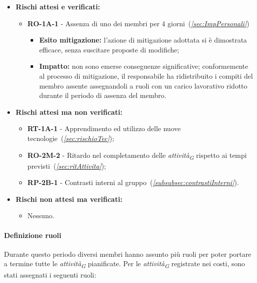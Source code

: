 \begin{itemize}
    \item \textbf{Rischi attesi e verificati:}
\begin{itemize}
    \item \textbf{RO-1A-1} - Assenza di uno dei membri per 4 giorni~(\textit{\ref{sec:ImpPersonali}})
    \begin{itemize}
        \item \textbf{Esito mitigazione:} 
        l'azione di mitigazione adottata si è dimostrata efficace, senza suscitare proposte di modifiche;
        \item \textbf{Impatto:}
        non sono emerse conseguenze significative; conformemente al processo di mitigazione, il responsabile ha ridistribuito i compiti del membro assente assegnandoli a ruoli con un carico lavorativo ridotto durante il periodo di assenza del membro.
    \end{itemize}
\end{itemize}
\item \textbf{Rischi attesi ma non verificati:}
 \begin{itemize}
    \item \textbf{RT-1A-1} - Apprendimento ed utilizzo delle nuove tecnologie~(\textit{\ref{sec:rischioTec}});
    \item \textbf{RO-2M-2} - Ritardo nel completamento delle \textit{attività}\textsubscript{\textit{G}} rispetto ai tempi previsti~(\textit{\ref{sec:ritAttivita}});
    \item \textbf{RP-2B-1} - Contrasti interni al gruppo~(\textit{\ref{subsubsec:contrastiInterni}}).
\end{itemize}
\item \textbf{Rischi non attesi ma verificati:}
\begin{itemize}
    \item Nessuno.
\end{itemize}
\end{itemize}

\pagebreak

\paragraph{Definizione ruoli}
Durante questo periodo diversi membri hanno assunto più ruoli per poter portare a termine tutte le \textit{attività}\textsubscript{\textit{G}} pianificate.
Per le \textit{attività}\textsubscript{\textit{G}} registrate nei costi, sono stati assegnati i seguenti ruoli:

